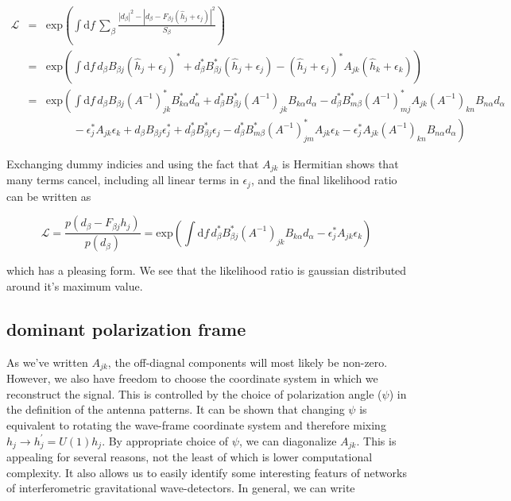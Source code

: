 \documentclass[10pt]{article}
\begin{document}
\begin{eqnarray}
\mathcal{L}  & = & \mathrm{exp}\left( \int\mathrm{d}f\, \sum_\beta \frac{\left|d_\beta\right|^2 - \left|d_\beta - F_{\beta j}\left(\hat{h}_j+\epsilon_j\right)\right|^2}{S_\beta} \right) \\
& = & \mathrm{exp}\left( \int\mathrm{d}f\, d_\beta B_{\beta j}\left(\hat{h}_j+\epsilon_j\right)^\ast + d_\beta^\ast B_{\beta j}^\ast\left(\hat{h}_j+\epsilon_j\right) - \left(\hat{h}_j+\epsilon_j\right)^\ast A_{jk} \left(\hat{h}_k+\epsilon_k\right) \right) \\
& = & \mathrm{exp}\left( \int\mathrm{d}f\, 
  d_\beta      B_{\beta j}      \left(A^{-1}\right)_{jk}^\ast B_{k\alpha}^\ast d_\alpha^\ast
+ d_\beta^\ast B_{\beta j}^\ast \left(A^{-1}\right)_{jk}      B_{k\alpha}      d_\alpha  
- d_\beta^\ast B_{m\beta}^\ast\left(A^{-1}\right)_{mj}^\ast A_{jk} \left(A^{-1}\right)_{kn}B_{n\alpha}d_\alpha
\right. \nonumber \\
&  & \left. \ \ \ \ \ \ \ \ \ \ \ 
- \epsilon_j^\ast                                            A_{jk} \epsilon_k
+ d_\beta      B_{\beta j}      \epsilon_j^\ast 
+ d_\beta^\ast B_{\beta j}^\ast \epsilon_j 
- d_\beta^\ast B_{m\beta}^\ast \left(A^{-1}\right)^\ast_{jm} A_{jk} \epsilon_k  
- \epsilon_j^\ast                                            A_{jk} \left(A^{-1}\right)_{kn} B_{n\alpha} d_\alpha 
\right) 
\end{eqnarray}

Exchanging dummy indicies and using the fact that $A_{jk}$ is Hermitian shows that many terms cancel, including all linear terms in $\epsilon_j$, and the final likelihood ratio can be written as

\begin{equation}
\mathcal{L} = \frac{p(d_\beta - F_{\beta j}h_j)}{p(d_\beta)} = \mathrm{exp}\left( \int\mathrm{d}f\, d_\beta^\ast B_{\beta j}^\ast \left(A^{-1}\right)_{jk} B_{k\alpha} d_\alpha - \epsilon_j^\ast A_{jk} \epsilon_k \right)
\end{equation}

which has a pleasing form. We see that the likelihood ratio is gaussian distributed around it's maximum value.

\subsection{dominant polarization frame}

As we've written $A_{jk}$, the off-diagnal components will most likely be non-zero. However, we also have freedom to choose the coordinate system in which we reconstruct the signal. This is controlled by the choice of polarization angle ($\psi$) in the definition of the antenna patterns. It can be shown that changing $\psi$ is equivalent to rotating the wave-frame coordinate system and therefore mixing $h_j \rightarrow h_j^\prime = U(1)h_j$. By appropriate choice of $\psi$, we can diagonalize $A_{jk}$. This is appealing for several reasons, not the least of which is lower computational complexity. It also allows us to easily identify some interesting featurs of networks of interferometric gravitational wave-detectors. In general, we can write
\end{document}
